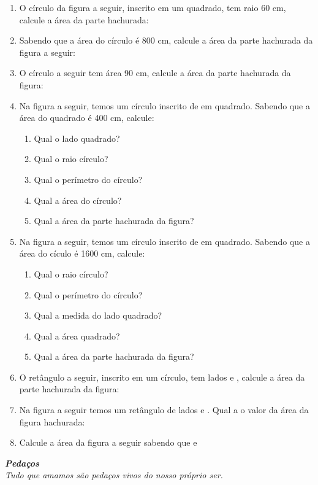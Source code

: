 \documentclass[twocolumn,oneside,a4paper,10pt]{article}
\begin{document}
\begin{enumerate}
\item O círculo da figura a seguir, inscrito em um quadrado, tem raio 60 cm, calcule a área da parte hachurada:

\item Sabendo que a área do círculo é 800 cm, calcule a área da parte hachurada da figura a seguir:

\item O círculo a seguir tem área 90 cm, calcule a área da parte hachurada da figura:

\item Na figura a seguir, temos um círculo inscrito de em quadrado.
\noindent Sabendo que a área do quadrado é 400 cm, calcule:
\begin{enumerate}
\item Qual o lado quadrado?
\item Qual o raio círculo?
\item Qual o perímetro do círculo?
\item Qual a área do círculo?
\item Qual a área da parte hachurada da figura?
\end{enumerate}

\item Na figura a seguir, temos um círculo inscrito de em quadrado.
\noindent Sabendo que a área do cículo é 1600 cm, calcule:
\begin{enumerate}
\item Qual o raio círculo?
\item Qual o perímetro do círculo?
\item Qual a medida do lado quadrado?
\item Qual a área quadrado?
\item Qual a área da parte hachurada da figura?
\end{enumerate}

\item O retângulo a seguir, inscrito em um círculo, tem lados  e , calcule a área da parte hachurada da figura:

\item Na figura a seguir temos um retângulo de lados   e . Qual a o valor da área da figura hachurada:

\item Calcule a área da figura a seguir sabendo que  e 
\end{enumerate}


\begin{flushright}
\textit{\textbf{Pedaços}\\
Tudo que amamos são pedaços vivos do nosso próprio ser.}
\end{flushright}
\end{document}
